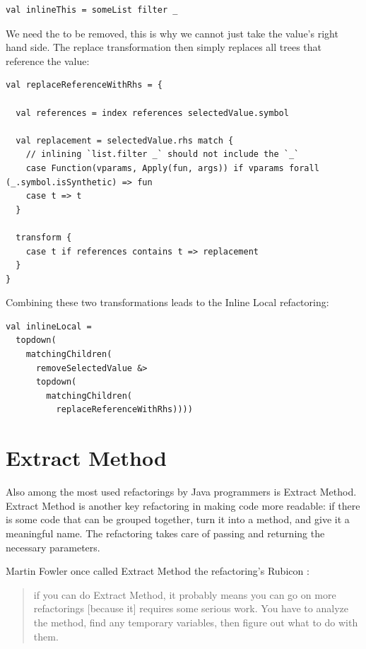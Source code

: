 \documentclass[10pt,a4paper,oneside]{scrreprt}
\begin{document}
\begin{lstlisting}
val inlineThis = someList filter _
\end{lstlisting}

We need the \src{\_} to be removed, this is why we cannot just take the value's right hand side. The replace transformation then simply replaces all trees that reference the value:

\begin{lstlisting}
val replaceReferenceWithRhs = {
      
  val references = index references selectedValue.symbol
  
  val replacement = selectedValue.rhs match {
    // inlining `list.filter _` should not include the `_`
    case Function(vparams, Apply(fun, args)) if vparams forall (_.symbol.isSynthetic) => fun
    case t => t
  }
  
  transform {
    case t if references contains t => replacement
  }
}
\end{lstlisting}

Combining these two transformations leads to the Inline Local refactoring:
\begin{lstlisting}
val inlineLocal = 
  topdown(
    matchingChildren(
      removeSelectedValue &> 
      topdown(
        matchingChildren(
          replaceReferenceWithRhs))))
\end{lstlisting}


\section{Extract Method}

Also among the most used refactorings by Java programmers is Extract Method. Extract Method is another key refactoring in making code more readable: if there is some code that can be grouped together, turn it into a method, and give it a meaningful name. The refactoring takes care of passing and returning the necessary parameters.

Martin Fowler once called Extract Method the refactoring's Rubicon \cite{FowlerRubicon}: 

\begin{quotation}
if you can do Extract Method, it probably means you can go on more refactorings [because it] requires some serious work. You have to analyze the method, find any temporary variables, then figure out what to do with them.
\end{quotation} 
\end{document}
